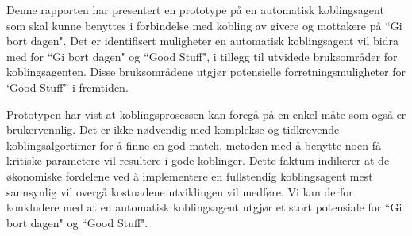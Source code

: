 Denne rapporten har presentert en prototype på en automatisk koblingsagent som skal kunne benyttes i forbindelse med kobling av givere og mottakere på ``Gi bort dagen". Det er identifisert muligheter en automatisk koblingsagent vil bidra med for ``Gi bort dagen" og ``Good Stuff", i tillegg til utvidede bruksområder for koblingsagenten. Disse bruksområdene utgjør potensielle forretningsmuligheter for `Good Stuff” i fremtiden.

Prototypen har vist at koblingsprosessen kan foregå på en enkel måte som også er brukervennlig. Det er ikke nødvendig med komplekse og tidkrevende koblingsalgortimer for å finne en god match, metoden med å benytte noen få kritiske parametere vil resultere i gode koblinger. Dette faktum indikerer at de økonomiske fordelene ved å implementere en fullstendig koblingsagent mest sannsynlig vil overgå kostnadene utviklingen vil medføre. Vi kan derfor konkludere med at en automatisk koblingsagent utgjør et stort potensiale for ``Gi bort dagen" og ``Good Stuff". 
